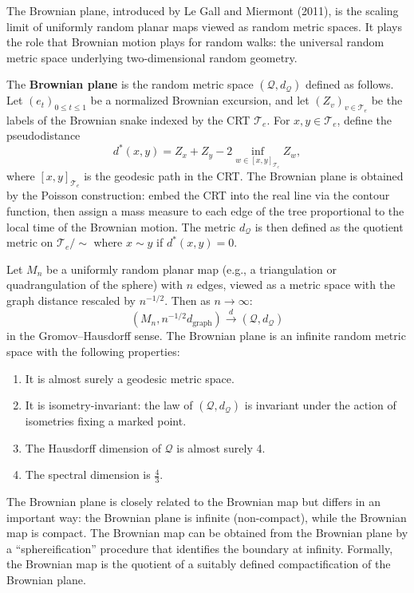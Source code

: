 The Brownian plane, introduced by Le Gall and Miermont (2011), is the scaling limit of uniformly random planar maps viewed as random metric spaces. It plays the role that Brownian motion plays for random walks: the universal random metric space underlying two-dimensional random geometry.

\begin{definition}
The \textbf{Brownian plane} is the random metric space $(\mathcal{Q}, d_{\mathcal{Q}})$ defined as follows. Let $(e_t)_{0 \leq t \leq 1}$ be a normalized Brownian excursion, and let $(Z_v)_{v \in \mathcal{T}_e}$ be the labels of the Brownian snake indexed by the CRT $\mathcal{T}_e$. For $x, y \in \mathcal{T}_e$, define the pseudodistance
\[
    d^*(x,y) = Z_x + Z_y - 2\inf_{w \in [x,y]_{\mathcal{T}_e}} Z_w,
\]
where $[x,y]_{\mathcal{T}_e}$ is the geodesic path in the CRT. The Brownian plane is obtained by the Poisson construction: embed the CRT into the real line via the contour function, then assign a mass measure to each edge of the tree proportional to the local time of the Brownian motion. The metric $d_{\mathcal{Q}}$ is then defined as the quotient metric on $\mathcal{T}_e / \!\sim$ where $x \sim y$ if $d^*(x,y) = 0$.
\end{definition}

\begin{theorem}
Let $M_n$ be a uniformly random planar map (e.g., a triangulation or quadrangulation of the sphere) with $n$ edges, viewed as a metric space with the graph distance rescaled by $n^{-1/2}$. Then as $n \to \infty$:
\[
    (M_n, n^{-1/2} d_{\text{graph}}) \xrightarrow{d} (\mathcal{Q}, d_{\mathcal{Q}})
\]
in the Gromov--Hausdorff sense. The Brownian plane is an infinite random metric space with the following properties:
\begin{enumerate}
    \item It is almost surely a geodesic metric space.
    \item It is isometry-invariant: the law of $(\mathcal{Q}, d_{\mathcal{Q}})$ is invariant under the action of isometries fixing a marked point.
    \item The Hausdorff dimension of $\mathcal{Q}$ is almost surely 4.
    \item The spectral dimension is $\frac{4}{3}$.
\end{enumerate}
\end{theorem}

\begin{remark}
The Brownian plane is closely related to the Brownian map but differs in an important way: the Brownian plane is infinite (non-compact), while the Brownian map is compact. The Brownian map can be obtained from the Brownian plane by a ``sphereification'' procedure that identifies the boundary at infinity. Formally, the Brownian map is the quotient of a suitably defined compactification of the Brownian plane.
\end{remark}

